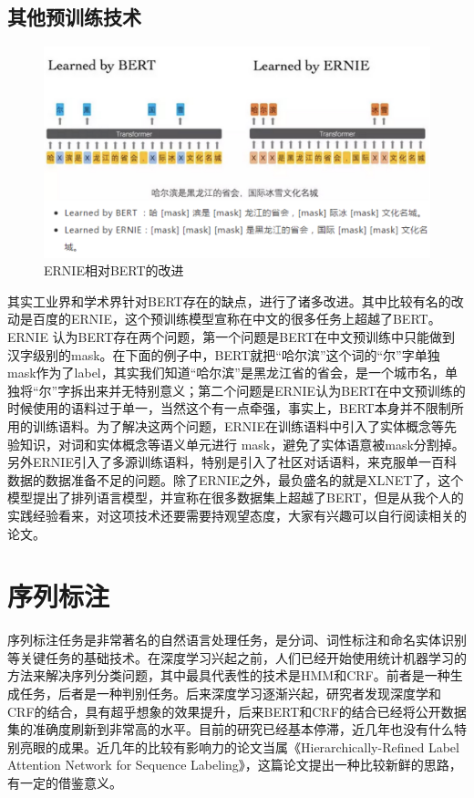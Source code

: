 \documentclass[twoside,a4paper,12pt]{book}%
\begin{document}
\section{其他预训练技术}
\begin{figure}[htbp]
\begin{center}
\includegraphics[width=5.8in]{figures/ernie1.png}
\caption{ERNIE相对BERT的改进}
\label{fig:ernie1}
\end{center}
\end{figure}
其实工业界和学术界针对\gls{BERT}存在的缺点，进行了诸多改进。其中比较有名的改动是百度的ERNIE，这个预训练模型宣称在中文的很多任务上超越了\gls{BERT}。ERNIE 认为\gls{BERT}存在两个问题，第一个问题是\gls{BERT}在中文预训练中只能做到汉字级别的mask。在下面的例子中，\gls{BERT}就把“哈尔滨”这个词的“尔”字单独mask作为了label，其实我们知道“哈尔滨”是黑龙江省的省会，是一个城市名，单独将“尔”字拆出来并无特别意义；第二个问题是ERNIE认为\gls{BERT}在中文预训练的时候使用的语料过于单一，当然这个有一点牵强，事实上，\gls{BERT}本身并不限制所用的训练语料。为了解决这两个问题，ERNIE在训练语料中引入了实体概念等先验知识，对词和实体概念等语义单元进行 mask，避免了实体语意被mask分割掉。另外ERNIE引入了多源训练语料，特别是引入了社区对话语料，来克服单一百科数据的数据准备不足的问题。除了ERNIE之外，最负盛名的就是XLNET了，这个模型提出了排列语言模型，并宣称在很多数据集上超越了\gls{BERT}，但是从我个人的实践经验看来，对这项技术还要需要持观望态度，大家有兴趣可以自行阅读相关的论文。


\chapter{序列标注}

序列标注任务是非常著名的自然语言处理任务，是分词、词性标注和命名实体识别等关键任务的基础技术。在深度学习兴起之前，人们已经开始使用统计机器学习的方法来解决序列分类问题，其中最具代表性的技术是\gls{HMM}和\gls{CRF}。前者是一种生成任务，后者是一种判别任务。后来深度学习逐渐兴起，研究者发现深度学和\gls{CRF}的结合，具有超乎想象的效果提升，后来\gls{BERT}和\gls{CRF}的结合已经将公开数据集的准确度刷新到非常高的水平。目前的研究已经基本停滞，近几年也没有什么特别亮眼的成果。近几年的比较有影响力的论文当属《Hierarchically-Refined Label Attention Network for Sequence Labeling》，这篇论文提出一种比较新鲜的思路，有一定的借鉴意义。
\end{document}
